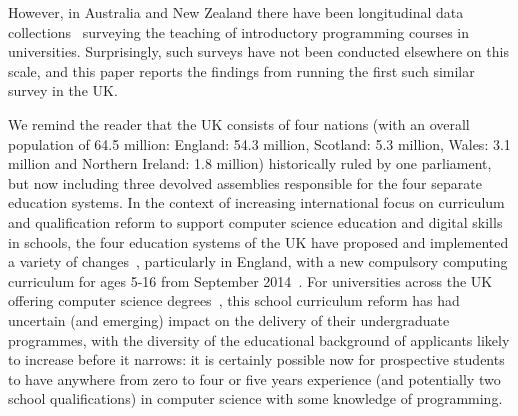 \documentclass[a4paper,11pt]{article}
\begin{document}
However, in Australia and New Zealand there have been longitudinal
data
collections~\cite{deraadt-et-al:2004,mason-et-al:2012,mason+cooper:2014}
surveying the teaching of introductory programming courses in
universities. Surprisingly, such surveys have not been conducted
elsewhere on this scale, and this paper reports the findings from
running the first such similar survey in the UK.

We remind the reader that the UK consists of four nations (with an
overall population of 64.5 million: England: 54.3 million, Scotland:
5.3 million, Wales: 3.1 million and Northern Ireland: 1.8 million)
historically ruled by one parliament, but now including three devolved
assemblies responsible for the four separate education systems. In the
context of increasing international focus on curriculum and
qualification reform to support computer science education and digital
skills in schools, the four education systems of the UK have proposed
and implemented a variety of
changes~\cite{rs:2012,brown-et-al-sigcse2013,brown-et-al-toce2014},
particularly in England, with a new compulsory computing curriculum for
ages 5-16 from September 2014~\cite{dfecomp:2013}. For universities
across the UK offering computer science degrees~\cite{qaacomp:2016},
this school curriculum reform has had uncertain (and emerging) impact
on the delivery of their undergraduate programmes, with the diversity
of the educational background of applicants likely to increase before
it narrows: it is certainly possible now for prospective students to
have anywhere from zero to four or five years experience (and
potentially two school qualifications) in computer science with some
knowledge of programming.

\end{document}
